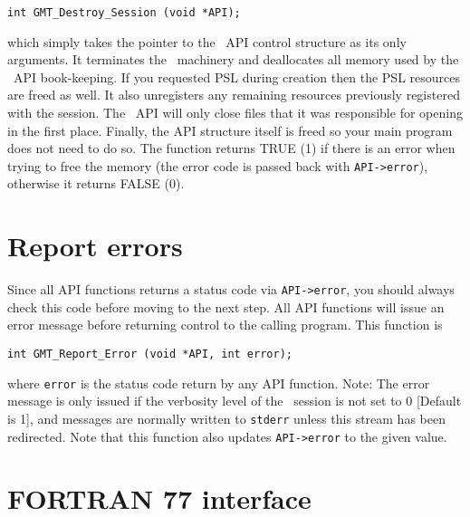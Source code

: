 \documentclass[11pt]{report}
\begin{document}
\begin{verbatim}
int GMT_Destroy_Session (void *API);
\end{verbatim}
which simply takes the pointer to the \GMT\ API control structure as its only arguments.  It 
terminates the \GMT\ machinery and deallocates all memory used by the \GMT\ API book-keeping.
If you requested PSL during creation then the PSL resources are freed as well.  It
also unregisters any remaining resources previously registered with the session.
The \GMT\ API will only close files that it was responsible for opening in the first place.
Finally, the API structure itself is freed so your main program does not need to do so.
The function returns TRUE (1) if there is an error when trying to free the memory
(the error code is passed back with \texttt{API->error}), otherwise it returns FALSE (0).

\section{Report errors}

Since all API functions returns a status code via \texttt{API->error}, you should always check this code before
moving to the next step.  All API functions will issue an error message before returning control
to the calling program.  This function is

\begin{verbatim}
int GMT_Report_Error (void *API, int error);
\end{verbatim}
where \texttt{error} is the status code return by any API function.  Note: The error message is
only issued if the verbosity level of the \GMT\ session is not set to 0 [Default is 1], and
messages are normally written to \texttt{stderr} unless this stream has been redirected.
Note that this function also updates \texttt{API->error} to the given value.
\section{FORTRAN 77 interface} 
\end{document}
